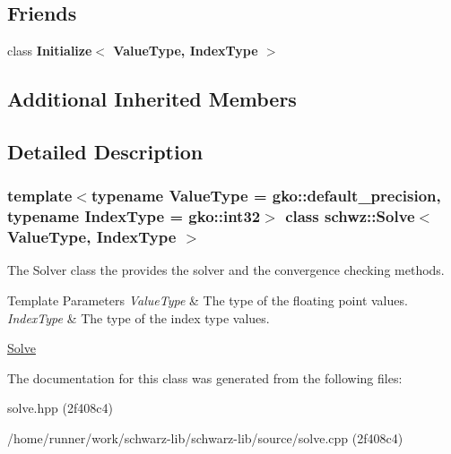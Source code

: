 \subsection*{Friends}
\begin{DoxyCompactItemize}
\item 
\mbox{\label{classschwz_1_1Solve_a7044b349fe5363eeace2d1a56b38f650}} 
class {\bfseries Initialize$<$ Value\+Type, Index\+Type $>$}
\end{DoxyCompactItemize}
\subsection*{Additional Inherited Members}


\subsection{Detailed Description}
\subsubsection*{template$<$typename Value\+Type = gko\+::default\+\_\+precision, typename Index\+Type = gko\+::int32$>$\newline
class schwz\+::\+Solve$<$ Value\+Type, Index\+Type $>$}

The Solver class the provides the solver and the convergence checking methods. 


\begin{DoxyTemplParams}{Template Parameters}
{\em Value\+Type} & The type of the floating point values. \\
\hline
{\em Index\+Type} & The type of the index type values.\\
\hline
\end{DoxyTemplParams}
\hyperlink{group__solve}{Solve} 

The documentation for this class was generated from the following files\+:\begin{DoxyCompactItemize}
\item 
solve.\+hpp (2f408c4)\item 
/home/runner/work/schwarz-\/lib/schwarz-\/lib/source/solve.\+cpp (2f408c4)\end{DoxyCompactItemize}
